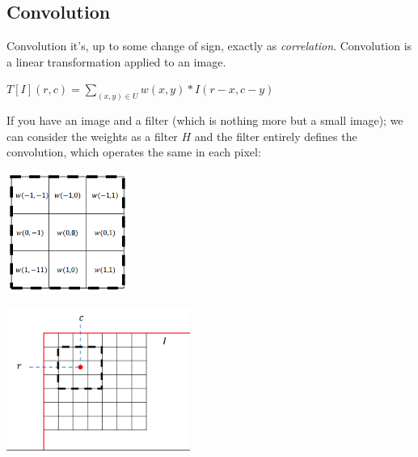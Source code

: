 \subsection{Convolution}
Convolution it's, up to some change of sign, exactly as \textit{correlation}. Convolution is a linear transformation applied to an image.
\begin{center}
    $T[I](r, c)=\sum_{(x, y) \in U} w(x, y) * I(r-x, c-y)$
\end{center}
If you have an image and a filter (which is nothing more but a small image); we can consider the weights as a filter $H$ and the filter entirely defines the convolution, which operates the same in each pixel:
\begin{center}
    \includegraphics[width=0.3\textwidth]{images_CNN/filter.PNG}\par\vspace{1cm}
\includegraphics[width=0.45\textwidth]{images_CNN/imag.PNG}\par\vspace{1cm}
\end{center}


